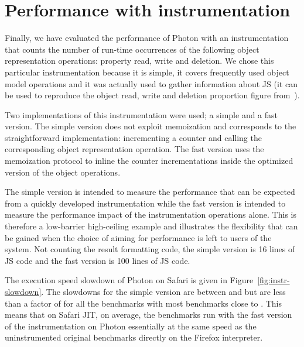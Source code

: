 \FloatBarrier


\section{Performance with instrumentation}


Finally, we have evaluated the performance of Photon with an instrumentation
that counts the number of run-time occurrences of the following object
representation operations: property read, write and deletion. We chose this
particular instrumentation because it is simple, it covers frequently used
object model operations and it was actually used to gather information about JS
(it can be used to reproduce the object read, write and deletion proportion
figure from~\cite{behavior_js}).

Two implementations of this instrumentation were used; a simple and a
fast version.  The simple version does not exploit memoization and
corresponds to the straightforward implementation: incrementing a
counter and calling the corresponding object representation
operation. The fast version uses the memoization protocol to inline
the counter incrementations inside the optimized version of the object
operations.

The simple version is intended to measure the performance that can be
expected from a quickly developed instrumentation while the fast
version is intended to measure the performance impact of the
instrumentation operations alone. This is therefore a low-barrier
high-ceiling example and illustrates the flexibility that can be
gained when the choice of aiming for performance is left to users of
the system.  Not counting the result formatting code, the simple
version is 16 lines of JS code and the fast version is 100 lines of
JS code.

The execution speed slowdown of Photon on Safari is given in
Figure~\ref{fig:instr-slowdown}. The slowdowns for the simple version are
between  and  but are less than a factor of  for
all the benchmarks with most benchmarks close to . This means that on
Safari JIT, on average, the benchmarks run with the fast version of the
instrumentation on Photon essentially at the same speed as the uninstrumented
original benchmarks directly on the Firefox interpreter.


